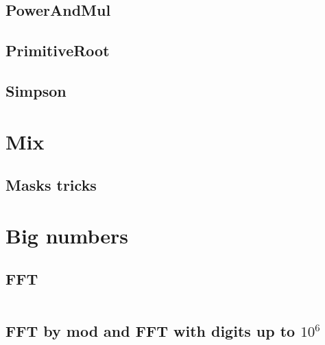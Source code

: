 \subsection{PowerAndMul}

\subsection{PrimitiveRoot}

\subsection{Simpson}



\section{Mix}

\subsection{Masks tricks}



\section{Big numbers}

\subsection{FFT}
\inputminted[mathescape,tabsize=2]{cpp}{../BigNum/FFT.cpp}
\subsection{FFT by mod and FFT with digits up to $10^6$}
\inputminted[mathescape,tabsize=2]{cpp}{../BigNum/FFT_mod_ll.cpp}
